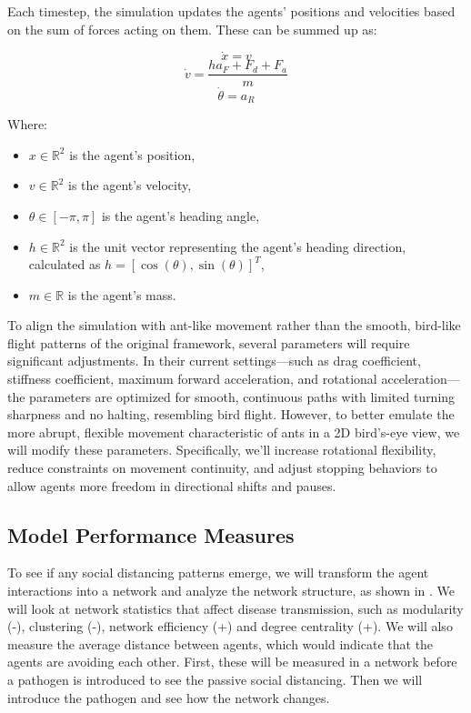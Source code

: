 \documentclass[9pt]{IEEEtran}
\begin{document}
Each timestep, the simulation updates the agents' positions and velocities based on the sum of forces acting on them.  
These can be summed up as:  

$$ \dot{x} = v $$  
$$ \dot{v} = \frac{ha_F + F_d + F_a}{m} $$  
$$ \dot{\theta} = a_R $$  

Where:
\begin{itemize}
    \item $x \in \mathbb{R}^2$ is the agent's position,
    \item $v \in \mathbb{R}^2$ is the agent's velocity,
    \item $\theta \in [-\pi, \pi]$ is the agent's heading angle,
    \item $h \in \mathbb{R}^2$ is the unit vector representing the agent's heading direction, calculated as $h = [\cos(\theta), \sin(\theta)]^T$,
    \item $m \in \mathbb{R}$ is the agent's mass.\\
\end{itemize}

To align the simulation with ant-like movement rather than the smooth, bird-like flight patterns of the original framework, several parameters will require significant adjustments. In their current settings—such as drag coefficient, stiffness coefficient, maximum forward acceleration, and rotational acceleration—the parameters are optimized for smooth, continuous paths with limited turning sharpness and no halting, resembling bird flight. However, to better emulate the more abrupt, flexible movement characteristic of ants in a 2D bird's-eye view, we will modify these parameters. Specifically, we’ll increase rotational flexibility, reduce constraints on movement continuity, and adjust stopping behaviors to allow agents more freedom in directional shifts and pauses.

\subsection{Model Performance Measures}

To see if any social distancing patterns emerge, we will transform the agent interactions into a network and analyze the network structure, as shown in \cite{Stroeymeyt2018}. We will look at network statistics that affect disease transmission, such as modularity (-), clustering (-), network efficiency (+) and degree centrality (+). We will also measure the average distance between agents, which would indicate that the agents are avoiding each other. First, these will be measured in a network before a pathogen is introduced to see the passive social distancing. Then we will introduce the pathogen and see how the network changes.
\end{document}
